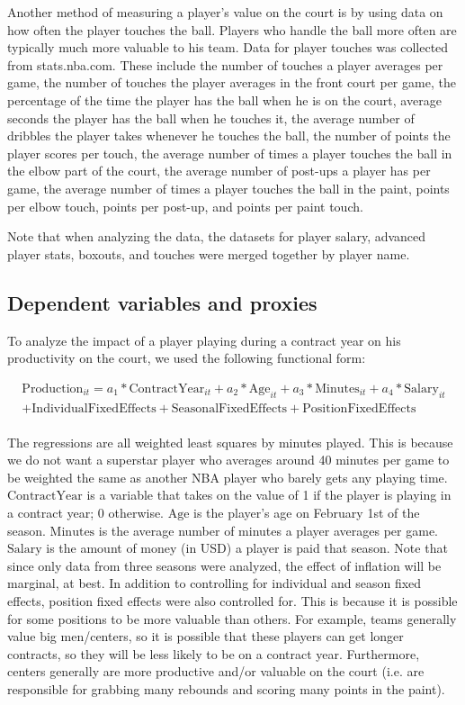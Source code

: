 \documentclass[12pt]{article}
\begin{document}
	Another method of measuring a player's value on the court is by using data on how often the player touches the ball. Players who handle the ball more often are typically much more valuable to his team. Data for player touches was collected from stats.nba.com. These include the number of touches a player averages per game, the number of touches the player averages in the front court per game, the percentage of the time the player has the ball when he is on the court, average seconds the player has the ball when he touches it, the average number of dribbles the player takes whenever he touches the ball, the number of points the player scores per touch, the average number of times a player touches the ball in the elbow part of the court, the average number of post-ups a player has per game, the average number of times a player touches the ball in the paint, points per elbow touch, points per post-up, and points per paint touch. 
	
	Note that when analyzing the data, the datasets for player salary, advanced player stats, boxouts, and touches were merged together by player name. 
	
	\subsection{Dependent variables and proxies}
	
	To analyze the impact of a player playing during a contract year on his productivity on the court, we used the following functional form:
	
	\[
	\begin{aligned}
	\mathrm{Production}_{it} = a_1*\mathrm{ContractYear}_{it} + a_2*\mathrm{Age}_{it} + a_3*\mathrm{Minutes}_{it} + a_4*\mathrm{Salary}_{it}  \\
	+ \mathrm{IndividualFixedEffects} + \mathrm{SeasonalFixedEffects} + \mathrm{PositionFixedEffects} \\
	\end{aligned}
	\]
	
	The regressions are all weighted least squares by minutes played. This is because we do not want a superstar player who averages around 40 minutes per game to be weighted the same as another NBA player who barely gets any playing time. $\mathrm{ContractYear}$ is a variable that takes on the value of 1 if the player is playing in a contract year; 0 otherwise. $\mathrm{Age}$ is the player's age on February 1st of the season. $\mathrm{Minutes}$ is the average number of minutes a player averages per game. $\mathrm{Salary}$ is the amount of money (in USD) a player is paid that season. Note that since only data from three seasons were analyzed, the effect of inflation will be marginal, at best. In addition to controlling for individual and season fixed effects, position fixed effects were also controlled for. This is because it is possible for some positions to be more valuable than others. For example, teams generally value big men/centers, so it is possible that these players can get longer contracts, so they will be less likely to be on a contract year. Furthermore, centers generally are more productive and/or valuable on the court (i.e. are responsible for grabbing many rebounds and scoring many points in the paint). 
	
\end{document}
